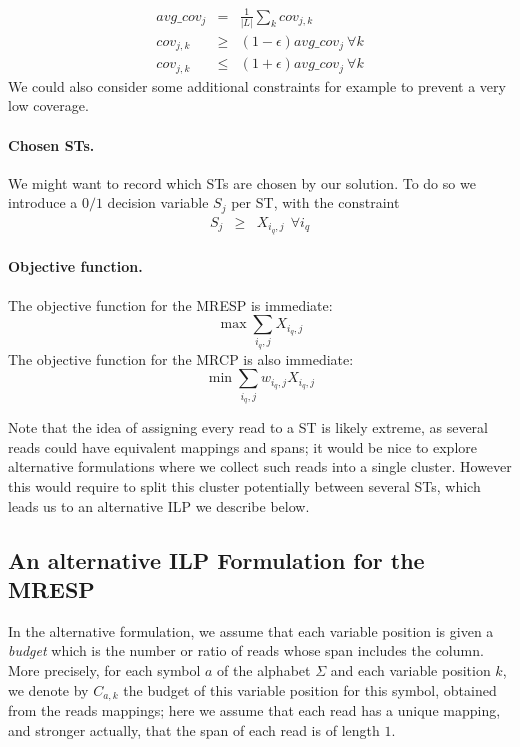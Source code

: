 \documentclass[10pt]{llncs}
\begin{document}
\begin{eqnarray}
    \label{eq:uniform_coverage}
    avg\_cov_j & =   & \frac{1}{|L|} \sum_{k} cov_{j,k} \\
    cov_{j,k}  &\geq & (1-\epsilon) avg\_cov_j\  \forall k \\
    cov_{j,k}  &\leq & (1+\epsilon) avg\_cov_j\  \forall k
\end{eqnarray}
We could also consider some additional constraints for example to prevent a very low coverage.

\paragraph{Chosen STs.} We might want to record which STs are chosen by our solution. To do so we introduce a $0/1$ decision variable $S_j$ per ST, with the constraint
\begin{eqnarray}
    \label{eq:ST}
    S_j & \geq & X_{i_q,j}\ \ \forall i_q
\end{eqnarray}

\paragraph{Objective function.} The objective function for the MRESP is immediate:
\begin{equation}
    \label{eq:obj_MRESP}
    \max \sum_{i_q,j} X_{i_q,j}
\end{equation}
The objective function for the MRCP is also immediate:
\begin{equation}
    \label{eq:obj_MRCP}
    \min \sum_{i_q,j} w_{i_q,j}X_{i_q,j}
\end{equation}

Note that the idea of assigning every read to a ST is likely extreme, as several reads could have equivalent mappings and spans; it would be nice to explore alternative formulations where we collect such reads into a single cluster. However this would require to split this cluster potentially between several STs, which leads us to an alternative ILP we describe below.

\subsection{An alternative ILP Formulation for the MRESP}
\label{ssec:ILP2}

In the alternative formulation, we assume that each variable position is given a \textit{budget} which is the number or ratio of reads whose span includes the column. More precisely, for each symbol $a$ of the alphabet $\Sigma$ and each variable position $k$, we denote by $C_{a,k}$ the budget of this variable position for this symbol, obtained from the reads mappings; here we assume that each read has a unique mapping, and stronger actually, that the span of each read is of length $1$. 
\end{document}
